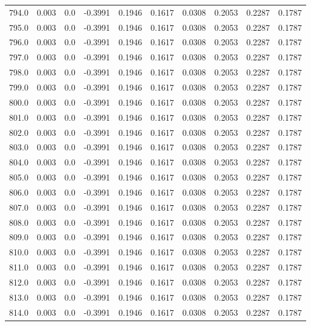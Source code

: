 \begin{longtable}{lrrrrrrrrr}
794.0 & 0.003 & 0.0 & -0.3991 & 0.1946 & 0.1617 & 0.0308 & 0.2053 & 0.2287 & 0.1787 \\
795.0 & 0.003 & 0.0 & -0.3991 & 0.1946 & 0.1617 & 0.0308 & 0.2053 & 0.2287 & 0.1787 \\
796.0 & 0.003 & 0.0 & -0.3991 & 0.1946 & 0.1617 & 0.0308 & 0.2053 & 0.2287 & 0.1787 \\
797.0 & 0.003 & 0.0 & -0.3991 & 0.1946 & 0.1617 & 0.0308 & 0.2053 & 0.2287 & 0.1787 \\
798.0 & 0.003 & 0.0 & -0.3991 & 0.1946 & 0.1617 & 0.0308 & 0.2053 & 0.2287 & 0.1787 \\
799.0 & 0.003 & 0.0 & -0.3991 & 0.1946 & 0.1617 & 0.0308 & 0.2053 & 0.2287 & 0.1787 \\
800.0 & 0.003 & 0.0 & -0.3991 & 0.1946 & 0.1617 & 0.0308 & 0.2053 & 0.2287 & 0.1787 \\
801.0 & 0.003 & 0.0 & -0.3991 & 0.1946 & 0.1617 & 0.0308 & 0.2053 & 0.2287 & 0.1787 \\
802.0 & 0.003 & 0.0 & -0.3991 & 0.1946 & 0.1617 & 0.0308 & 0.2053 & 0.2287 & 0.1787 \\
803.0 & 0.003 & 0.0 & -0.3991 & 0.1946 & 0.1617 & 0.0308 & 0.2053 & 0.2287 & 0.1787 \\
804.0 & 0.003 & 0.0 & -0.3991 & 0.1946 & 0.1617 & 0.0308 & 0.2053 & 0.2287 & 0.1787 \\
805.0 & 0.003 & 0.0 & -0.3991 & 0.1946 & 0.1617 & 0.0308 & 0.2053 & 0.2287 & 0.1787 \\
806.0 & 0.003 & 0.0 & -0.3991 & 0.1946 & 0.1617 & 0.0308 & 0.2053 & 0.2287 & 0.1787 \\
807.0 & 0.003 & 0.0 & -0.3991 & 0.1946 & 0.1617 & 0.0308 & 0.2053 & 0.2287 & 0.1787 \\
808.0 & 0.003 & 0.0 & -0.3991 & 0.1946 & 0.1617 & 0.0308 & 0.2053 & 0.2287 & 0.1787 \\
809.0 & 0.003 & 0.0 & -0.3991 & 0.1946 & 0.1617 & 0.0308 & 0.2053 & 0.2287 & 0.1787 \\
810.0 & 0.003 & 0.0 & -0.3991 & 0.1946 & 0.1617 & 0.0308 & 0.2053 & 0.2287 & 0.1787 \\
811.0 & 0.003 & 0.0 & -0.3991 & 0.1946 & 0.1617 & 0.0308 & 0.2053 & 0.2287 & 0.1787 \\
812.0 & 0.003 & 0.0 & -0.3991 & 0.1946 & 0.1617 & 0.0308 & 0.2053 & 0.2287 & 0.1787 \\
813.0 & 0.003 & 0.0 & -0.3991 & 0.1946 & 0.1617 & 0.0308 & 0.2053 & 0.2287 & 0.1787 \\
814.0 & 0.003 & 0.0 & -0.3991 & 0.1946 & 0.1617 & 0.0308 & 0.2053 & 0.2287 & 0.1787 \\

\end{longtable}
